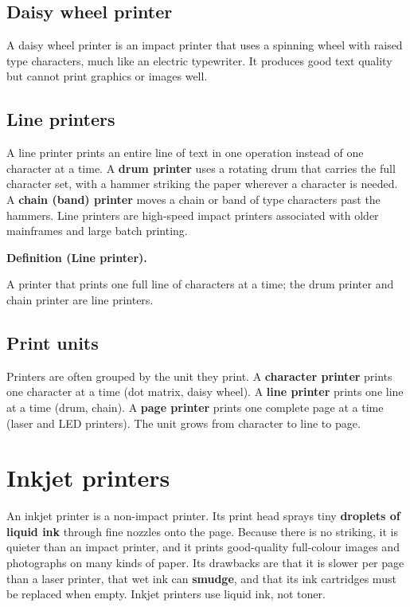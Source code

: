 \documentclass[11pt]{article}
\newenvironment{definitionbox}[1]{%
  \par\noindent\textbf{Definition (#1).}\ \itshape
}{\par\vspace{0.3em}}
\begin{document}
\subsection*{Daisy wheel printer}
A daisy wheel printer is an impact printer that uses a spinning wheel with
raised type characters, much like an electric typewriter. It produces good
text quality but cannot print graphics or images well.

\subsection*{Line printers}
A line printer prints an entire line of text in one operation instead of one
character at a time. A \textbf{drum printer} uses a rotating drum that carries
the full character set, with a hammer striking the paper wherever a character
is needed. A \textbf{chain (band) printer} moves a chain or band of type
characters past the hammers. Line printers are high-speed impact printers
associated with older mainframes and large batch printing.

\begin{definitionbox}{Line printer}
A printer that prints one full line of characters at a time; the drum printer
and chain printer are line printers.
\end{definitionbox}

\subsection*{Print units}
Printers are often grouped by the unit they print. A \textbf{character
printer} prints one character at a time (dot matrix, daisy wheel). A
\textbf{line printer} prints one line at a time (drum, chain). A \textbf{page
printer} prints one complete page at a time (laser and LED printers). The
unit grows from character to line to page.

\section{Inkjet printers}
An inkjet printer is a non-impact printer. Its print head sprays tiny
\textbf{droplets of liquid ink} through fine nozzles onto the page. Because
there is no striking, it is quieter than an impact printer, and it prints
good-quality full-colour images and photographs on many kinds of paper. Its
drawbacks are that it is slower per page than a laser printer, that wet ink
can \textbf{smudge}, and that its ink cartridges must be replaced when empty.
Inkjet printers use liquid ink, not toner.
\end{document}
